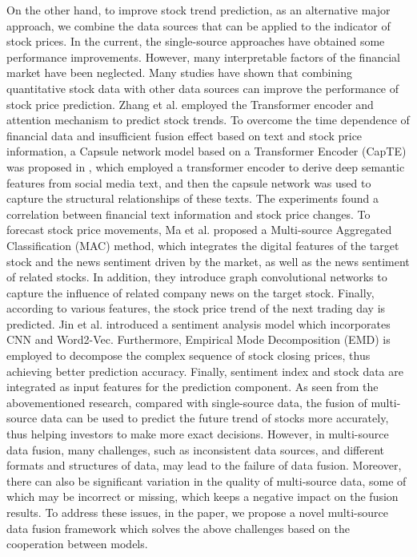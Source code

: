 \documentclass[sn-mathphys]{sn-jnl}%
\theoremstyle{thmstyleone}%
\theoremstyle{thmstyletwo}%
\theoremstyle{thmstylethree}%
\begin{document}
On the other hand, to improve stock trend prediction, as an alternative major approach, we combine the data sources that can be applied to the indicator of stock prices. In the current, the single-source approaches have obtained some performance improvements. However, many interpretable factors of the financial market have been neglected. Many studies have shown that combining quantitative stock data with other data sources can improve the performance of stock price prediction\cite{RN162,RN160,RN196}. Zhang et al. \cite{RN159} employed the Transformer encoder and attention mechanism to predict stock trends. To overcome the time dependence of financial data and insufficient fusion effect based on text and stock price information, a Capsule network model based on a Transformer Encoder (CapTE) was proposed in \cite{RN158}, which employed a transformer encoder to derive deep semantic features from social media text, and then the capsule network was used to capture the structural relationships of these texts. The experiments found a correlation between financial text information and stock price changes. To forecast stock price movements, Ma et al. \cite{RN203} proposed a Multi-source Aggregated Classification (MAC) method, which integrates the digital features of the target stock and the news sentiment driven by the market, as well as the news sentiment of related stocks. In addition, they introduce graph convolutional networks to capture the influence of related company news on the target stock. Finally, according to various features, the stock price trend of the next trading day is predicted. Jin et al. \cite{RN200} introduced a sentiment analysis model which incorporates CNN and Word2-Vec. Furthermore, Empirical Mode Decomposition (EMD) is employed to decompose the complex sequence of stock closing prices, thus achieving better prediction accuracy. Finally, sentiment index and stock data are integrated as input features for the prediction component. As seen from the abovementioned research, compared with single-source data, the fusion of multi-source data can be used to predict the future trend of stocks more accurately, thus helping investors to make more exact decisions. However, in multi-source data fusion, many challenges, such as inconsistent data sources, and different formats and structures of data, may lead to the failure of data fusion. Moreover, there can also be significant variation in the quality of multi-source data, some of which may be incorrect or missing, which keeps a negative impact on the fusion results. To address these issues, in the paper, we propose a novel multi-source data fusion framework which solves the above challenges based on the cooperation between models.
\end{document}
